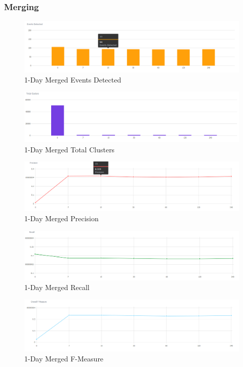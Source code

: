 \documentclass[a4paper,portrait,12pt]{article}
\begin{document}
\subsubsection{Merging}

\begin{figure}[H]
	\centering
	\includegraphics[width=\linewidth]{images/7days-merged-events-detected.png}
	\caption{1-Day Merged Events Detected}
	\label{fig:7days-merged-events-detected}
\end{figure}

\begin{figure}[H]
	\centering
	\includegraphics[width=\linewidth]{images/7days-merged-total-clusters.png}
	\caption{1-Day Merged Total Clusters}
	\label{fig:7days-merged-total-clusters}
\end{figure}

\begin{figure}[H]
	\centering
	\includegraphics[width=\linewidth]{images/7days-merged-precision.png}
	\caption{1-Day Merged Precision}
	\label{fig:7days-merged-precision}
\end{figure}

\begin{figure}[H]
	\centering
	\includegraphics[width=\linewidth]{images/7days-merged-recall.png}
	\caption{1-Day Merged Recall}
	\label{fig:7days-merged-recall}
\end{figure}

\begin{figure}[H]
	\centering
	\includegraphics[width=\linewidth]{images/7days-merged-f-measure.png}
	\caption{1-Day Merged F-Measure}
	\label{fig:7days-merged-f-measure}
\end{figure}
\end{document}

